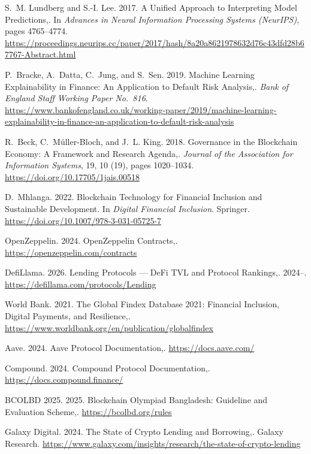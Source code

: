 {\begin{enumerate}[label={[\arabic*]}]
\item S.~M. Lundberg and S.-I. Lee. 2017. A Unified Approach to Interpreting Model Predictions,. In \emph{Advances in Neural Information Processing Systems (NeurIPS)}, pages 4765--4774. \url{https://proceedings.neurips.cc/paper/2017/hash/8a20a8621978632d76c43dfd28b67767-Abstract.html}

\item P.~Bracke, A.~Datta, C.~Jung, and S.~Sen. 2019. Machine Learning Explainability in Finance: An Application to Default Risk Analysis,. \emph{Bank of England Staff Working Paper No.~816}. \url{https://www.bankofengland.co.uk/working-paper/2019/machine-learning-explainability-in-finance-an-application-to-default-risk-analysis}

\item R.~Beck, C.~M\"{u}ller-Bloch, and J.~L. King. 2018. Governance in the Blockchain Economy: A Framework and Research Agenda,. \emph{Journal of the Association for Information Systems}, 19, 10 (19), pages 1020--1034. \url{https://doi.org/10.17705/1jais.00518}

\item D.~Mhlanga. 2022. Blockchain Technology for Financial Inclusion and Sustainable Development. In \emph{Digital Financial Inclusion}. Springer. \url{https://doi.org/10.1007/978-3-031-05725-7}

\item OpenZeppelin. 2024. OpenZeppelin Contracts,. \url{https://openzeppelin.com/contracts}

\item DefiLlama. 2026. Lending Protocols --- DeFi TVL and Protocol Rankings,. 2024--. \url{https://defillama.com/protocols/Lending}

\item World Bank. 2021. The Global Findex Database 2021: Financial Inclusion, Digital Payments, and Resilience,. \url{https://www.worldbank.org/en/publication/globalfindex}

\item Aave. 2024. Aave Protocol Documentation,. \url{https://docs.aave.com/}

\item Compound. 2024. Compound Protocol Documentation,. \url{https://docs.compound.finance/}

\item BCOLBD 2025. 2025. Blockchain Olympiad Bangladesh: Guideline and Evaluation Scheme,. \url{https://bcolbd.org/rules}

\item Galaxy Digital. 2024. The State of Crypto Lending and Borrowing,. Galaxy Research. \url{https://www.galaxy.com/insights/research/the-state-of-crypto-lending}


\end{enumerate}}
